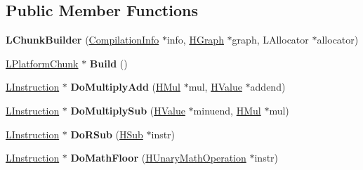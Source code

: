 \subsection*{Public Member Functions}
\begin{DoxyCompactItemize}
\item 
{\bfseries L\+Chunk\+Builder} (\hyperlink{classv8_1_1internal_1_1_compilation_info}{Compilation\+Info} $\ast$info, \hyperlink{classv8_1_1internal_1_1_h_graph}{H\+Graph} $\ast$graph, L\+Allocator $\ast$allocator)\hypertarget{classv8_1_1internal_1_1_l_chunk_builder_ad180af7a1b4ba31ad0d39440ea450103}{}\label{classv8_1_1internal_1_1_l_chunk_builder_ad180af7a1b4ba31ad0d39440ea450103}

\item 
\hyperlink{classv8_1_1internal_1_1_l_platform_chunk}{L\+Platform\+Chunk} $\ast$ {\bfseries Build} ()\hypertarget{classv8_1_1internal_1_1_l_chunk_builder_a8b527af21ab96e5a634f8ef1925e53d8}{}\label{classv8_1_1internal_1_1_l_chunk_builder_a8b527af21ab96e5a634f8ef1925e53d8}

\item 
\hyperlink{classv8_1_1internal_1_1_l_instruction}{L\+Instruction} $\ast$ {\bfseries Do\+Multiply\+Add} (\hyperlink{classv8_1_1internal_1_1_h_mul}{H\+Mul} $\ast$mul, \hyperlink{classv8_1_1internal_1_1_h_value}{H\+Value} $\ast$addend)\hypertarget{classv8_1_1internal_1_1_l_chunk_builder_a961628d6db963ab8bd8f7c63841c6f33}{}\label{classv8_1_1internal_1_1_l_chunk_builder_a961628d6db963ab8bd8f7c63841c6f33}

\item 
\hyperlink{classv8_1_1internal_1_1_l_instruction}{L\+Instruction} $\ast$ {\bfseries Do\+Multiply\+Sub} (\hyperlink{classv8_1_1internal_1_1_h_value}{H\+Value} $\ast$minuend, \hyperlink{classv8_1_1internal_1_1_h_mul}{H\+Mul} $\ast$mul)\hypertarget{classv8_1_1internal_1_1_l_chunk_builder_aa4cb88743d8b122d2d3694251f21e72e}{}\label{classv8_1_1internal_1_1_l_chunk_builder_aa4cb88743d8b122d2d3694251f21e72e}

\item 
\hyperlink{classv8_1_1internal_1_1_l_instruction}{L\+Instruction} $\ast$ {\bfseries Do\+R\+Sub} (\hyperlink{classv8_1_1internal_1_1_h_sub}{H\+Sub} $\ast$instr)\hypertarget{classv8_1_1internal_1_1_l_chunk_builder_a46046f9feb42d422770887ef5728a170}{}\label{classv8_1_1internal_1_1_l_chunk_builder_a46046f9feb42d422770887ef5728a170}

\item 
\hyperlink{classv8_1_1internal_1_1_l_instruction}{L\+Instruction} $\ast$ {\bfseries Do\+Math\+Floor} (\hyperlink{classv8_1_1internal_1_1_h_unary_math_operation}{H\+Unary\+Math\+Operation} $\ast$instr)\hypertarget{classv8_1_1internal_1_1_l_chunk_builder_acb8bde2509842c2423d1e2b8166a6fd8}{}\label{classv8_1_1internal_1_1_l_chunk_builder_acb8bde2509842c2423d1e2b8166a6fd8}


\end{DoxyCompactItemize}
